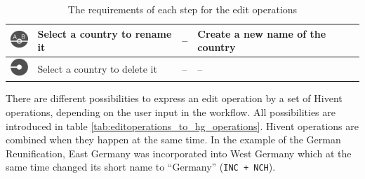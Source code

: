 \begin{table}[H]
\begin{center}
\begin{tabular}{m{0.9cm} m{4.2cm} m{4.2cm} m{3.5cm}}
  \midrule
  \raisebox{-0.35\height}
  {\includegraphics[width=0.72cm]{graphics/development/editing_hivent_data/edit_operations/REN}} &
  Select a country to rename it &
  -- &
  Create a new name of the country \\

  \midrule
  \raisebox{-0.35\height}
  {\includegraphics[width=0.72cm]{graphics/development/editing_hivent_data/edit_operations/DEL}} &
  Select a country to delete it &
  -- &
  -- \\

  \bottomrule
\end{tabular}
\caption{The requirements of each step for the edit operations}
\label{tab:editoperations_in_worklow}
\end{center}
\end{table}



\vspace{-1.0em}

There are different possibilities to express an edit operation by a set of Hivent operations, depending on the user input in the workflow. All possibilities are introduced in table \ref{tab:editoperations_to_hg_operations}. Hivent operations are combined when they happen at the same time. In the example of the German Reunification, East Germany was incorporated into West Germany which at the same time changed its short name to ``Germany'' (\texttt{INC + NCH}).

